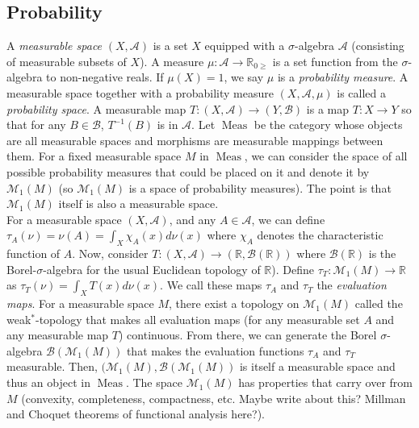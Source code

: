 \subsection{Probability}
A \emph{measurable space} $(X,\mathcal{A})$ is a set $X$ equipped with a $\sigma$-algebra $\mathcal{A}$ (consisting of measurable subsets of $X$). A measure $\mu : \mathcal{A} \to \mathbb{R}_{0\geq}$ is a set function from the $\sigma$-algebra to non-negative reals. If $\mu(X)=1$, we say $\mu$ is a \emph{probability measure}. A measurable space together with a probability measure $(X,\mathcal{A}, \mu)$ is called a \emph{probability space}.
A measurable map $T : (X,\mathcal{A}) \to (Y,\mathcal{B})$ is a map $T : X \to Y$ so that for any $B \in \mathcal{B}$, $T^{-1}(B)$ is in $\mathcal{A}$.
Let $\operatorname{Meas}$ be the category whose objects are all measurable spaces and morphisms are measurable mappings between them. For a fixed measurable space $M$ in $\operatorname{Meas}$, we can consider the space of all possible probability measures that could be placed on it and denote it by $\mathcal{M}_1(M)$ (so $\mathcal{M}_1(M)$ is a space of probability measures).
The point is that $\mathcal{M}_1(M)$ itself is also a measurable space. \\
For a measurable space $(X,\mathcal{A})$, and any $A \in \mathcal{A}$, we can define $\tau_A(\nu)=\nu(A)=\int_{X} \chi_{A}(x) d\nu(x)$ where $\chi_A$ denotes the characteristic function of $A$. Now, consider $T : (X, \mathcal{A}) \to (\mathbb{R},\mathcal{B}(\mathbb{R}))$ where $\mathcal{B}(\mathbb{R})$ is the Borel-$\sigma$-algebra for the usual Euclidean topology of $\mathbb{R}$). Define $\tau_T : \mathcal{M}_1(M) \to \mathbb{R}$ as $\tau_T(\nu)=\int_X T(x) d\nu(x)$. We call these maps $\tau_A$ and $\tau_T$ the \emph{evaluation maps}.
For a measurable space $M$, there exist a topology on $\mathcal{M}_1(M)$ called the weak$^*$-topology that makes all evaluation maps (for any measurable set $A$ and any measurable map $T$) continuous. From there, we can generate the Borel $\sigma$-algebra $\mathcal{B}(\mathcal{M}_1(M))$ that makes the evaluation functions $\tau_A$ and $\tau_T$ measurable. Then, $(\mathcal{M}_1(M),\mathcal{B}(\mathcal{M}_1(M))$ is itself a measurable space and thus an object in $\operatorname{Meas}$. The space $\mathcal{M}_1(M)$ has properties that carry over from $M$ (convexity, completeness, compactness, etc. Maybe write about this? Millman and Choquet theorems of functional analysis here?). \\ \\

